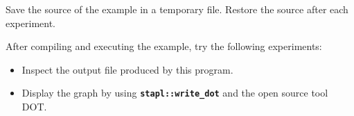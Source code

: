 \documentclass{report}
\begin{document}
Save the source of the example in a temporary file.
Restore the source after each experiment.

After compiling and executing the example, try the following experiments:
\begin{itemize}
\item
Inspect the output file produced by this program.
\item
Display the graph by using \texttt{{\bf stapl::write\_dot}} and the open source
tool DOT.
\end{itemize}
















\end{document}
